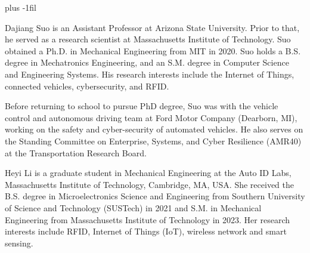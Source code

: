 \documentclass[lettersize,journal]{IEEEtran}
\begin{document}
 
\vspace{11pt}
\baselineskip plus -1fil
\begin{IEEEbiography}{Dajiang Suo}  is an Assistant Professor at Arizona State University. Prior to that, he served as a research scientist at Massachusetts Institute of Technology. Suo obtained a Ph.D. in Mechanical Engineering from MIT in 2020. Suo holds a B.S. degree in Mechatronics Engineering, and an S.M. degree in Computer Science and Engineering Systems. His research interests include the Internet of Things, connected vehicles, cybersecurity, and RFID.

Before returning to school to pursue PhD degree, Suo was with the vehicle control and autonomous driving team at Ford Motor Company (Dearborn, MI), working on the safety and cyber-security of automated vehicles. He also serves on the Standing Committee on Enterprise, Systems, and Cyber Resilience (AMR40) at the Transportation Research Board.
\end{IEEEbiography}

\vspace{11pt}

\begin{IEEEbiography}{Heyi Li} is a graduate student in Mechanical Engineering at the Auto ID Labs, Massachusetts Institute of Technology, Cambridge, MA, USA. She received the B.S. degree in Microelectronics Science and Engineering from Southern University of Science and Technology (SUSTech) in 2021 and S.M. in Mechanical Engineering from Massachusetts Institute of Technology in 2023. Her research interests include RFID, Internet of Things (IoT), wireless network and smart sensing.

\end{IEEEbiography}

\vspace{11pt}
\end{document}
